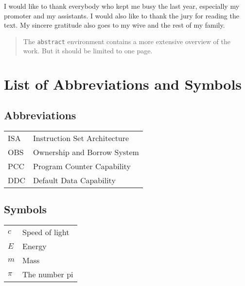 \documentclass[master=ecws,masteroption=ss]{kulemt}
\begin{document}
\begin{preface}
  I would like to thank everybody who kept me busy the last year,
  especially my promoter and my assistants. I would also like to thank the
  jury for reading the text. My sincere gratitude also goes to my wive and
  the rest of my family.
\end{preface}

\tableofcontents*

\begin{abstract}
  The \texttt{abstract} environment contains a more extensive overview of
  the work. But it should be limited to one page.

  \lipsum[1]
\end{abstract}

\listoffiguresandtables
\chapter{List of Abbreviations and Symbols}
\section*{Abbreviations}
\begin{flushleft}
  \renewcommand{\arraystretch}{1.1}
  \begin{tabularx}{\textwidth}{@{}p{12mm}X@{}}
    ISA   & Instruction Set Architecture \\
    OBS   & Ownership and Borrow System \\
    PCC   & Program Counter Capability \\
    DDC   & Default Data Capability \\
  \end{tabularx}
\end{flushleft}
\section*{Symbols}
\begin{flushleft}
  \renewcommand{\arraystretch}{1.1}
  \begin{tabularx}{\textwidth}{@{}p{12mm}X@{}}
    $c$   & Speed of light \\
    $E$   & Energy \\
    $m$   & Mass \\
    $\pi$ & The number pi \\
  \end{tabularx}
\end{flushleft}
\end{document}
